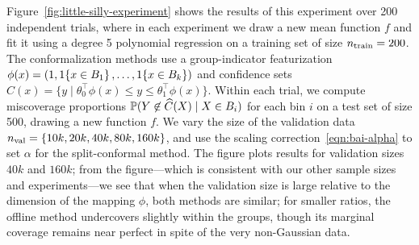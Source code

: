 \documentclass[11pt]{article}
\begin{document}
Figure~\ref{fig:little-silly-experiment} shows the results of this
experiment over 200 independent trials, where in each
experiment we draw a new mean function $f$ and fit it using
a degree 5 polynomial regression on a training
set of size $n_{\textup{train}} = 200$.
%
The conformalization methods use a group-indicator featurization $\phi(x) =
(1, 1\!\left\{x \in B_1\right\}, \ldots, 1\!\left\{x \in B_k\right\})$ and confidence sets
$C(x) = \{y \mid \theta_0^\top \phi(x) \le y \le \theta_1^\top
\phi(x)\}$.
%
Within each trial, we compute miscoverage
proportions $\mathbb{P}(Y \not \in \widehat{C}(X) \mid X \in B_i)$ for each bin $i$ on
a test set of size 500, drawing a new function $f$.
%
We vary the size of the validation data $n_{\textup{val}}
= \{10 k, 20k, 40k, 80k, 160k\}$, and
use the scaling correction~\eqref{eqn:bai-alpha} to set $\alpha$ for
the split-conformal method.
%
The figure plots results for validation sizes $40k$ and $160k$; from the
figure---which is consistent with our other sample sizes and
experiments---we see that when the validation size is large relative to the
dimension of the mapping $\phi$, both methods are similar; for smaller
ratios, the offline method undercovers slightly within the groups, though
its marginal coverage remains near perfect in spite of the very non-Gaussian
data.
\end{document}
